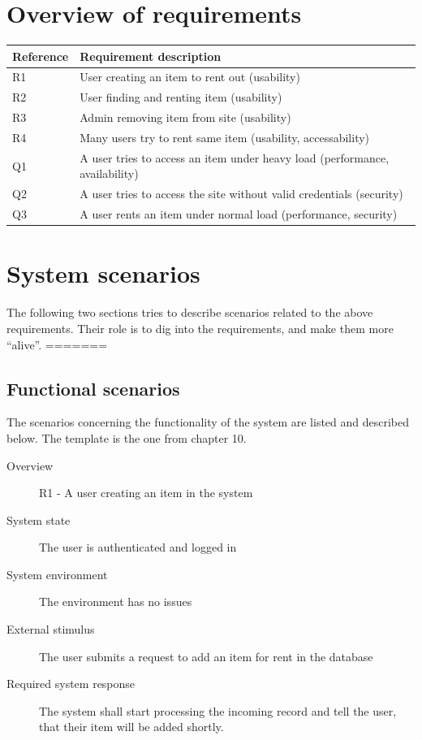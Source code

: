 \documentclass[a4paper,11pt]{report}
\begin{document}
\section{Overview of requirements}\label{sec:overv-requ}
\begin{center}
  \begin{tabular}[h]{| l |  l |}
    \hline
    \textbf{Reference} & \textbf{Requirement description} \\
    \hline
    R1 & User creating an item to rent out (usability)\\
    \hline
    R2 & User finding and renting item (usability)\\
    \hline
    R3 & Admin removing item from site (usability)\\
    \hline
    R4 & Many users try to rent same item (usability, accessability)\\
    \hline
    Q1 & A user tries to access an item under heavy load (performance, availability)\\
    \hline
    Q2 & A user tries to access the site without valid credentials (security)\\
    \hline
    Q3 & A user rents an item under normal load (performance, security)\\
    \hline
  \end{tabular}
\end{center}

\section{System scenarios}
\label{sec:system-scenarios}
The following two sections tries to describe scenarios related to the above
requirements. Their role is to dig into the requirements, and make them more
``alive''.
=======

\subsection{Functional scenarios}
\label{sec:functional-scenarios}
The scenarios concerning the functionality of the system are listed and
described below. The template is the one from \cite{rozanski2011software}
chapter 10.

\begin{description}
    \item[Overview] R1 - A user creating an item in the system
    \item[System state] The user is authenticated and logged in
    \item[System environment] The environment has no issues
    \item[External stimulus] The user submits a request to add an item for rent
        in the database
    \item[Required system response] The system shall start processing the
        incoming record and tell the user, that their item will be added
        shortly.
\end{description}
\end{document}
